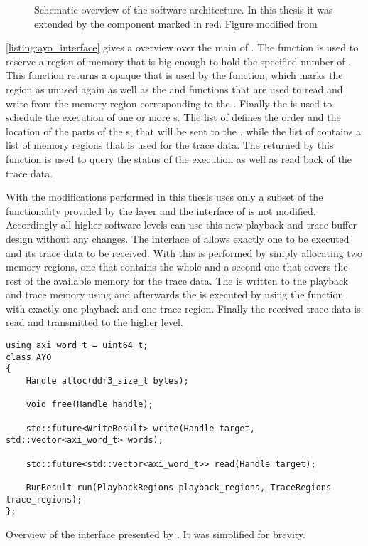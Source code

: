 \begin{figure}[htbp]
\centerline{}
\caption{Schematic overview of the \BSSTwo{} software architecture. In this thesis it was extended by the \ayo{} component marked in red. Figure modified from \autocite{mueller2022scalable}}\label{fig:bss_stack}
\end{figure}

\autoref{listing:ayo_interface} gives a overview over the main \API{} of \ayo{}. The  function is used to reserve a region of memory that is big enough to hold the specified number of . This function returns a opaque  that is used by the  function, which marks the region as unused again as well as the  and  functions that are used to read and write from the memory region corresponding to the .
Finally the  is used to schedule the execution of one or more \PlaybackProgram{}s. The list of  defines the order and the location of the parts of the \PlaybackProgram{}s, that will be sent to the \pbexec{}, while the list of  contains a list of memory regions that is used for the trace data. The  returned by this function is used to query the status of the execution as well as read back of the trace data.

With the modifications performed in this thesis \hxcomm{} uses only a subset of the functionality provided by the \ayo{} layer and the interface of \hxcomm{} is not modified. Accordingly all higher software levels can use this new playback and trace buffer design without any changes.
The interface of \hxcomm{} allows exactly one \PlaybackProgram{} to be executed and its trace data to be received. With \ayo{} this is performed by simply allocating two memory regions, one that contains the whole \PlaybackProgram{} and a second one that covers the rest of the available memory for the trace data. The \PlaybackProgram{} is written to the playback and trace memory using  and afterwards the \PlaybackProgram{} is executed by using the  function with exactly one playback and one trace region. Finally the received trace data is read and transmitted to the higher level.

\begin{listing}
\begin{verbatim}
using axi_word_t = uint64_t;
class AYO
{
	Handle alloc(ddr3_size_t bytes);

	void free(Handle handle);

	std::future<WriteResult> write(Handle target, std::vector<axi_word_t> words);

	std::future<std::vector<axi_word_t>> read(Handle target);

	RunResult run(PlaybackRegions playback_regions, TraceRegions trace_regions);
};
\end{verbatim}
\caption{Overview of the interface presented by \ayo{}. It was simplified for brevity.}\label{listing:ayo_interface}
\end{listing}


